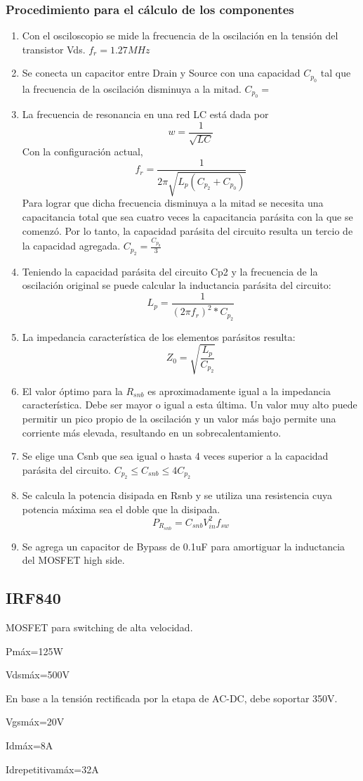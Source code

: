 \subsubsection{Procedimiento para el cálculo de los componentes}

\begin{enumerate}
    \item Con el osciloscopio se mide la frecuencia de la oscilación en la tensión del transistor Vds. $f_{r}=1.27MHz$ %
    \item Se conecta un capacitor entre Drain y Source con una capacidad $C_{p_{0}}$ tal que la frecuencia de la oscilación disminuya a la mitad. $C_{p_{0}}=$
    \item La frecuencia de resonancia en una red LC está dada por
    $$ w=\frac{1}{\sqrt{LC}} $$
    Con la configuración actual, 
    $$ f_{r}=\frac{1}{2\pi\sqrt{L_{p}(C_{p_{2}}+C_{p_{0}})}} $$
    Para lograr que dicha frecuencia disminuya a la mitad se necesita una capacitancia total que sea cuatro veces la capacitancia parásita con la que se comenzó.
    Por lo tanto, la capacidad parásita del circuito resulta un tercio de la capacidad agregada. $C_{p_{2}} = \frac{C_{p_{0}}}{3}$
    \item Teniendo la capacidad parásita del circuito Cp2 y la frecuencia de la oscilación original se puede calcular la inductancia parásita del circuito:
    $$ L_{p}=\frac{1}{(2\pi f_{r})^{2}*C_{p_{2}}} $$
    \item La impedancia característica de los elementos parásitos resulta:
    $$ Z_{0}=\sqrt{\frac{L_p}{C_{p_2}}} $$
    \item El valor óptimo para la $R_{snb}$ es aproximadamente igual a la impedancia característica. Debe ser mayor o igual a esta última. Un valor muy alto puede permitir un pico propio de la oscilación y un valor más bajo permite una corriente más elevada, resultando en un sobrecalentamiento.
    \item Se elige una Csnb que sea igual o hasta 4 veces superior a la capacidad parásita del circuito. $C_{p_2}\leq C_{snb}\leq 4C_{p_2}$
    \item Se calcula la potencia disipada en Rsnb y se utiliza una resistencia cuya potencia máxima sea el doble que la disipada.
    $$ P_{R_{snb}}=C_{snb}V_{in}^2f_{sw} $$
    \item Se agrega un capacitor de Bypass de 0.1uF para amortiguar la inductancia del MOSFET high side.     
\end{enumerate}

\subsection{IRF840}

MOSFET para switching de alta velocidad. 

Pmáx=125W

Vdsmáx=500V

En base a la tensión rectificada por la etapa de AC-DC, debe soportar 350V. 

Vgsmáx=20V
 
Idmáx=8A

Idrepetitivamáx=32A


